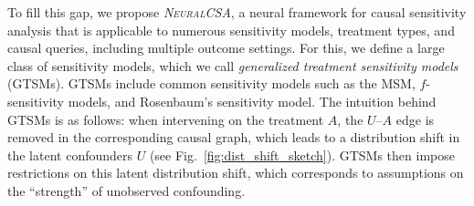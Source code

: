 \documentclass{article} %
\newcommand{\frameworkname}{\textsc{NeuralCSA}\xspace}
\theoremstyle{definition}
\theoremstyle{plain}
\begin{document}


To fill this gap, we propose \emph{\frameworkname}, a neural framework for causal sensitivity analysis that is applicable to numerous sensitivity models, treatment types, and causal queries, including multiple outcome settings. For this, we define a large class of sensitivity models, which we call \emph{generalized treatment sensitivity models} (GTSMs). GTSMs include common sensitivity models such as the MSM, $f$-sensitivity models, and Rosenbaum's sensitivity model. The intuition behind GTSMs is as follows: when intervening on the treatment $A$, the $U$--$A$ edge is removed in the corresponding causal graph, which leads to a distribution shift in the latent confounders $U$ (see Fig.~\ref{fig:dist_shift_sketch}). GTSMs then impose restrictions on this latent distribution shift, which corresponds to assumptions on the ``strength'' of unobserved confounding.
\end{document}
